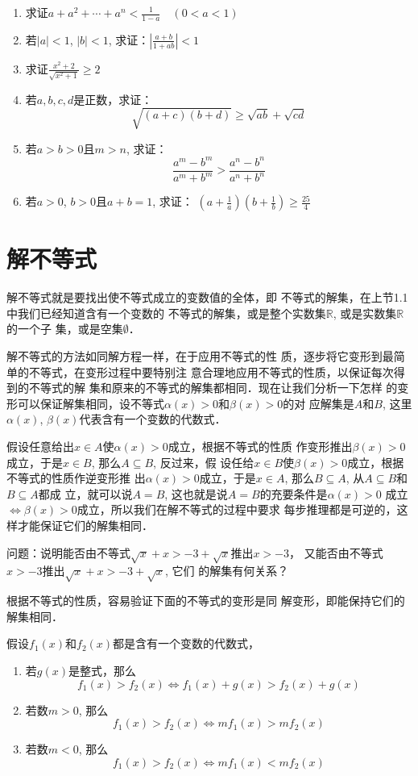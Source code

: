 \begin{enumerate}
\item 求证$a+a^2+\cdots+a^n<\frac{1}{1-a}\quad (0<a<1)$

\item 若$|a|<1$, $|b|<1$, 求证：$\left|\frac{a+b}{1+ab}\right|<1$

\item 求证$\frac{x^2+2}{\sqrt{x^2+1}}\ge 2$

\item 若$a,b,c,d$是正数，求证：
$$\sqrt{(a+c)(b+d)}\ge \sqrt{ab}+\sqrt{cd}$$
\item 若$a>b>0$且$m>n$, 求证：
\[\frac{a^m-b^m}{a^m+b^m}>\frac{a^n-b^n}{a^n+b^n}\]

\item 若$a>0$, $b>0$且$a+b=1$, 求证：
$\left(a+\frac{1}{a}\right)\left(b+\frac{1}{b}\right)\ge \frac{25}{4}$
\end{enumerate}

\section{解不等式}
解不等式就是要找出使不等式成立的变数值的全体，即
不等式的解集，在上节1.1中我们已经知道含有一个变数的
不等式的解集，或是整个实数集$\mathbb{R}$, 或是实数集$\mathbb{R}$的一个子
集，或是空集$\emptyset$．

解不等式的方法如同解方程一样，在于应用不等式的性
质，逐步将它变形到最简单的不等式，在变形过程中要特别注
意合理地应用不等式的性质，以保证每次得到的不等式的解
集和原来的不等式的解集都相同．现在让我们分析一下怎样
的变形可以保证解集相同，设不等式$\alpha(x)>0$和$\beta(x)>0$的对
应解集是$A$和$B$, 这里$\alpha(x)$, $\beta(x)$代表含有一个变数的代数式．

假设任意给出$x\in A$使$\alpha(x)>0$成立，根据不等式的性质
作变形推出$\beta(x)>0$成立，于是$x\in B$, 那么$A\subseteq B$, 反过来，假
设任给$x\in B$使$\beta(x)>0$成立，根据不等式的性质作逆变形推
出$\alpha(x)>0$成立，于是$x\in A$, 那么$B\subseteq A$, 从$A\subseteq B$和$B\subseteq A$都成
立，就可以说$A=B$, 这也就是说$A=B$的充要条件是$\alpha(x)>0$
成立$\Longleftrightarrow\beta(x)>0$成立，所以我们在解不等式的过程中要求
每步推理都是可逆的，这样才能保证它们的解集相同．

问题：说明能否由不等式$\sqrt{x}+x>-3+\sqrt{x}$推出$x>-3$，
又能否由不等式$x>-3$推出$\sqrt{x}+x>-3+\sqrt{x}$, 它们
的解集有何关系？

根据不等式的性质，容易验证下面的不等式的变形是同
解变形，即能保持它们的解集相同．

假设$f_1(x)$和$f_2(x)$都是含有一个变数的代数式，
\begin{enumerate}
    \item 若$g(x)$是整式，那么
    \[f_1(x)>f_2(x)\Longleftrightarrow f_1(x)+g(x)>f_2(x)+g(x)\]
    \item 若数$m>0$, 那么
    \[f_1(x)>f_2(x)\Longleftrightarrow mf_1(x)>mf_2(x)\]
    \item 若数$m<0$, 那么
    \[f_1(x)>f_2(x)\Longleftrightarrow mf_1(x)<mf_2(x)\]
\end{enumerate}


